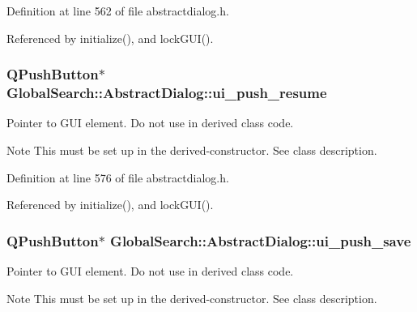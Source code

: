 Definition at line 562 of file abstractdialog.\+h.



Referenced by initialize(), and lock\+G\+U\+I().

\hypertarget{classGlobalSearch_1_1AbstractDialog_a04a1131601c5eab39ef105f385aceca5}{}
\subsubsection[{ui\+\_\+push\+\_\+resume}]{\setlength{\rightskip}{0pt plus 5cm}Q\+Push\+Button$\ast$ Global\+Search\+::\+Abstract\+Dialog\+::ui\+\_\+push\+\_\+resume\hspace{0.3cm}{\ttfamily [protected]}}\label{classGlobalSearch_1_1AbstractDialog_a04a1131601c5eab39ef105f385aceca5}
Pointer to G\+U\+I element. Do not use in derived class code. \begin{DoxyNote}{Note}
This must be set up in the derived-\/constructor. See class description. 
\end{DoxyNote}


Definition at line 576 of file abstractdialog.\+h.



Referenced by initialize(), and lock\+G\+U\+I().

\hypertarget{classGlobalSearch_1_1AbstractDialog_a695ed25af57ce8c854e21d3f2c18e250}{}
\subsubsection[{ui\+\_\+push\+\_\+save}]{\setlength{\rightskip}{0pt plus 5cm}Q\+Push\+Button$\ast$ Global\+Search\+::\+Abstract\+Dialog\+::ui\+\_\+push\+\_\+save\hspace{0.3cm}{\ttfamily [protected]}}\label{classGlobalSearch_1_1AbstractDialog_a695ed25af57ce8c854e21d3f2c18e250}
Pointer to G\+U\+I element. Do not use in derived class code. \begin{DoxyNote}{Note}
This must be set up in the derived-\/constructor. See class description. 
\end{DoxyNote}


